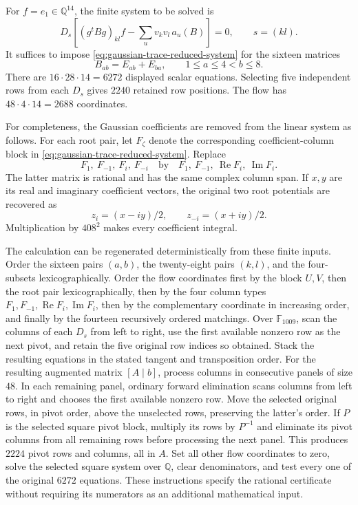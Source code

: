 For \(f=e_1\in\mathbb Q^{14}\), the finite system to be solved is
\begin{equation}
 D_s\left[
    (g^tBg)_{kl}f-
    \sum_u v_kv_l\,a_u(B)
 \right]=0,
 \qquad s=(kl).
 \label{eq:gaussian-trace-reduced-system}
\end{equation}
It suffices to impose \eqref{eq:gaussian-trace-reduced-system} for the sixteen matrices
\[
 B_{ab}=E_{ab}+E_{ba},\qquad
 1\le a\le4< b\le8.
\]
There are \(16\cdot28\cdot14=6272\) displayed scalar equations.
Selecting five independent rows from each \(D_s\) gives \(2240\)
retained row positions.  The flow has
\(48\cdot4\cdot14=2688\) coordinates.

For completeness, the Gaussian coefficients are removed from the
linear system as follows.  For each root pair, let \(F_\zeta\) denote
the corresponding coefficient-column block in \eqref{eq:gaussian-trace-reduced-system}.  Replace
\[
 F_1,\ F_{-1},\ F_i,\ F_{-i}
 \quad\text{by}\quad
 F_1,\ F_{-1},\ \operatorname{Re}F_i,\ \operatorname{Im}F_i.
\]
The latter matrix is rational and has the same complex column span.
If \(x,y\) are its real and imaginary coefficient vectors, the
original two root potentials are recovered as
\begin{equation}
 z_i=(x-iy)/2,\qquad z_{-i}=(x+iy)/2.
 \label{eq:gaussian-trace-real-imag}
\end{equation}
Multiplication by \(408^2\) makes every coefficient integral.

The calculation can be regenerated deterministically from these
finite inputs.  Order the sixteen pairs \((a,b)\), the twenty-eight
pairs \((k,l)\), and the four-subsets lexicographically.  Order the
flow coordinates first by the block \(U,V\), then the root pair
lexicographically, then by the four column types
\(F_1,F_{-1},\operatorname{Re}F_i,\operatorname{Im}F_i\), then by
the complementary coordinate in increasing order, and finally by
the fourteen recursively ordered matchings.  Over
\(\mathbb F_{1009}\), scan the columns of each \(D_s\) from left
to right, use the first available nonzero row as the next pivot,
and retain the five original row indices so obtained.  Stack the
resulting equations in the stated tangent and transposition order.
For the resulting augmented matrix \([A\mid b]\), process columns
in consecutive panels of size \(48\).  In each remaining panel,
ordinary forward elimination scans columns from left to right and
chooses the first available nonzero row.  Move the selected original
rows, in pivot order, above the unselected rows, preserving the
latter's order.  If \(P\) is the selected square pivot block,
multiply its rows by \(P^{-1}\) and eliminate its pivot columns
from all remaining rows before processing the next panel.
This produces \(2224\) pivot rows and columns, all in \(A\).
Set all other flow coordinates to zero, solve the selected square
system over \(\mathbb Q\), clear denominators, and test every
one of the original \(6272\) equations.  These instructions specify
the rational certificate without requiring its numerators as an
additional mathematical input.

